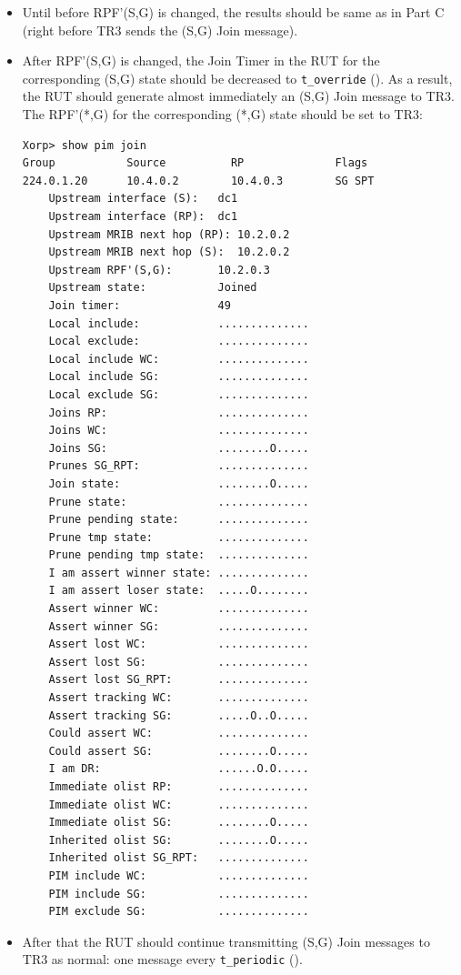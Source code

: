 \documentclass[11pt]{report}
\begin{document}
\begin{itemize}

  \item Until before RPF'(S,G) is changed, the results should
  be same as in Part C (right before TR3 sends the (S,G) Join message).

  \item After RPF'(S,G) is changed,
  the Join Timer in the RUT for the corresponding (S,G) state
  should be decreased to \verb=t_override= ({\PimsmTOverride}). As a result,
  the RUT should generate almost immediately an (S,G) Join message to TR3.
  The RPF'(*,G) for the corresponding (*,G) state should be set to TR3:

\begin{verbatim}
Xorp> show pim join
Group           Source          RP              Flags
224.0.1.20      10.4.0.2        10.4.0.3        SG SPT 
    Upstream interface (S):   dc1
    Upstream interface (RP):  dc1
    Upstream MRIB next hop (RP): 10.2.0.2
    Upstream MRIB next hop (S):  10.2.0.2
    Upstream RPF'(S,G):       10.2.0.3
    Upstream state:           Joined 
    Join timer:               49
    Local include:            ..............
    Local exclude:            ..............
    Local include WC:         ..............
    Local include SG:         ..............
    Local exclude SG:         ..............
    Joins RP:                 ..............
    Joins WC:                 ..............
    Joins SG:                 ........O.....
    Prunes SG_RPT:            ..............
    Join state:               ........O.....
    Prune state:              ..............
    Prune pending state:      ..............
    Prune tmp state:          ..............
    Prune pending tmp state:  ..............
    I am assert winner state: ..............
    I am assert loser state:  .....O........
    Assert winner WC:         ..............
    Assert winner SG:         ..............
    Assert lost WC:           ..............
    Assert lost SG:           ..............
    Assert lost SG_RPT:       ..............
    Assert tracking WC:       ..............
    Assert tracking SG:       .....O..O.....
    Could assert WC:          ..............
    Could assert SG:          ........O.....
    I am DR:                  ......O.O.....
    Immediate olist RP:       ..............
    Immediate olist WC:       ..............
    Immediate olist SG:       ........O.....
    Inherited olist SG:       ........O.....
    Inherited olist SG_RPT:   ..............
    PIM include WC:           ..............
    PIM include SG:           ..............
    PIM exclude SG:           ..............
\end{verbatim}

  \item After that the RUT should continue transmitting 
  (S,G) Join messages to TR3 as normal: one message every \verb=t_periodic=
  ({\PimsmTPeriodic}).

\end{itemize}
\end{document}
